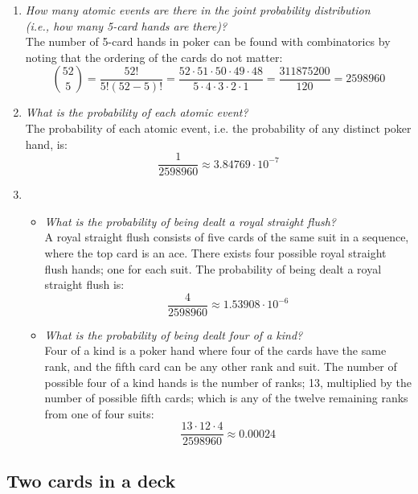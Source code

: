 \begin{enumerate}[label=\alph*)]
\item \textit{How many atomic events are there in the joint probability distribution\\(i.e., how many 5-card hands are there)?}\\
The number of 5-card hands in poker can be found with combinatorics by noting that the ordering of the cards do not matter:
\begin{equation}
\binom{52}{5} =
\frac{52!}{5!(52 - 5)!} =
\frac{52 \cdot 51 \cdot 50 \cdot 49 \cdot 48}{5 \cdot 4 \cdot 3 \cdot 2 \cdot 1} =
\frac{311875200}{120} =
2598960
\end{equation}
\item \textit{What is the probability of each atomic event?}\\
The probability of each atomic event, i.e. the probability of any distinct poker hand, is:
\begin{equation}
\frac{1}{2598960} \approx 3.84769 \cdot 10^{-7}
\end{equation}
\item
\begin{itemize}
\item \textit{What is the probability of being dealt a royal straight flush?}\\
A royal straight flush consists of five cards of the same suit in a sequence, where the top card is an ace. There exists four possible royal straight flush hands; one for each suit. The probability of being dealt a royal straight flush is:
\begin{equation}
\frac{4}{2598960} \approx 1.53908 \cdot 10^{-6}
\end{equation}
\item \textit{What is the probability of being dealt four of a kind?}\\
Four of a kind is a poker hand where four of the cards have the same rank, and the fifth card can be any other rank and suit. The number of possible four of a kind hands is the number of ranks; 13, multiplied by the number of possible fifth cards; which is any of the twelve remaining ranks from one of four suits:
\begin{equation}
\frac{13 \cdot 12 \cdot 4}{2598960} \approx 0.00024
\end{equation}
\end{itemize}
\end{enumerate}

\subsection{Two cards in a deck}

